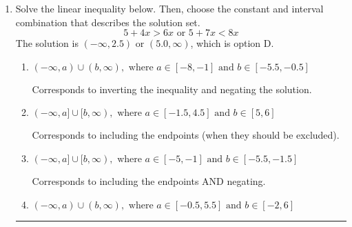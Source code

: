 \documentclass{extbook}[14pt]
\newcommand{\litem}[1]{\item #1

\rule{\textwidth}{0.4pt}}
\begin{document}
\begin{enumerate}
{\begin{enumerate}[label=\Alph*.]
$(1.20, -6.60]$, which is the correct interval but negatives of the actual endpoints.
\item \( (-\infty, a) \cup [b, \infty), \text{ where } a \in [-0.8, 3.2] \text{ and } b \in [-12.6, -2.6] \)

$(-\infty, 1.20) \cup [-6.60, \infty)$, which corresponds to displaying the and-inequality as an or-inequality and getting negatives of the actual endpoints.
\item \( [a, b), \text{ where } a \in [0.1, 1.9] \text{ and } b \in [-6.6, -4.6] \)

$[1.20, -6.60)$, which corresponds to flipping the inequality and getting negatives of the actual endpoints.
\item \( (-\infty, a] \cup (b, \infty), \text{ where } a \in [1.2, 3.2] \text{ and } b \in [-6.6, -4.6] \)

$(-\infty, 1.20] \cup (-6.60, \infty)$, which corresponds to displaying the and-inequality as an or-inequality AND flipping the inequality AND getting negatives of the actual endpoints.
\item \( \text{None of the above.} \)

* This is correct as the answer should be $(-1.20, 6.60]$.
\end{enumerate}

\textbf{General Comment:} To solve, you will need to break up the compound inequality into two inequalities. Be sure to keep track of the inequality! It may be best to draw a number line and graph your solution.
}
\litem{
Solve the linear inequality below. Then, choose the constant and interval combination that describes the solution set.
\[ 5 + 4 x > 6 x \text{ or } 5 + 7 x < 8 x \]The solution is \( (-\infty, 2.5) \text{ or } (5.0, \infty) \), which is option D.\begin{enumerate}[label=\Alph*.]
\item \( (-\infty, a) \cup (b, \infty), \text{ where } a \in [-8, -1] \text{ and } b \in [-5.5, -0.5] \)

Corresponds to inverting the inequality and negating the solution.
\item \( (-\infty, a] \cup [b, \infty), \text{ where } a \in [-1.5, 4.5] \text{ and } b \in [5, 6] \)

Corresponds to including the endpoints (when they should be excluded).
\item \( (-\infty, a] \cup [b, \infty), \text{ where } a \in [-5, -1] \text{ and } b \in [-5.5, -1.5] \)

Corresponds to including the endpoints AND negating.
\item \( (-\infty, a) \cup (b, \infty), \text{ where } a \in [-0.5, 5.5] \text{ and } b \in [-2, 6] \)


\end{enumerate}}
\end{enumerate}
\end{document}
